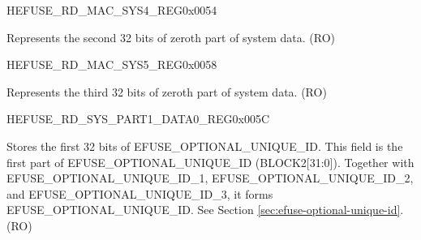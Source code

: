     \begin{register}{H}{EFUSE\_RD\_MAC\_SYS4\_REG}{0x0054}\label{regdesc:EFUSERDMACSYS4REG}
    \regnewline%
    \begin{regdesc}\begin{reglist}
    \label{fielddesc:EFUSESYSDATAPART01}\item [EFUSE\_SYS\_DATA\_PART0\_1] Represents the second 32 bits of zeroth part of system data. (RO)
    \end{reglist}\end{regdesc}
    \end{register}


    \begin{register}{H}{EFUSE\_RD\_MAC\_SYS5\_REG}{0x0058}\label{regdesc:EFUSERDMACSYS5REG}
    \regnewline%
    \begin{regdesc}\begin{reglist}
    \label{fielddesc:EFUSESYSDATAPART02}\item [EFUSE\_SYS\_DATA\_PART0\_2] Represents the third 32 bits of zeroth part of system data. (RO)
    \end{reglist}\end{regdesc}
    \end{register}


    \begin{register}{H}{EFUSE\_RD\_SYS\_PART1\_DATA0\_REG}{0x005C}\label{regdesc:EFUSERDSYSPART1DATA0REG}\label{regdesc:EFUSERDSYSPART1DATANREG}
%
\regnewline%
\begin{regdesc}\begin{reglist}
\label{fielddesc:EFUSEOPTIONALUNIQUEID}\item [EFUSE\_OPTIONAL\_UNIQUE\_ID] Stores the first 32 bits of EFUSE\_OPTIONAL\_UNIQUE\_ID. This field is the first part of EFUSE\_OPTIONAL\_UNIQUE\_ID (BLOCK2[31:0]). Together with EFUSE\_OPTIONAL\_UNIQUE\_ID\_1, EFUSE\_OPTIONAL\_UNIQUE\_ID\_2, and EFUSE\_OPTIONAL\_UNIQUE\_ID\_3, it forms EFUSE\_OPTIONAL\_UNIQUE\_ID. See Section \ref{sec:efuse-optional-unique-id}. (RO)
\end{reglist}\end{regdesc}
\end{register}


